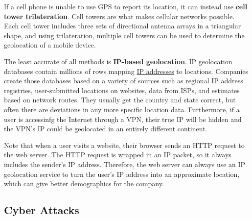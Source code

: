 \documentclass{article}
\begin{document}
  If a cell phone is unable to use GPS to report its location, it can instead use \textbf{cell tower trilateration}. Cell towers are what makes cellular networks possible. Each cell tower includes three sets of directional antenna arrays in a triangular shape, and using trilateration, multiple cell towers can be used to determine the geolocation of a mobile device. 

  The least accurate of all methods is \textbf{IP-based geolocation}. IP geolocation databases contain millions of rows mapping \hyperref[def:ip-addresses]{IP addresses} to locations. Companies create those databases based on a variety of sources such as regional IP address registries, user-submitted locations on websites, data from ISPs, and estimates based on network routes. They usually get the country and state correct, but often there are deviations in any more specific location data. Furthermore, if a user is accessinfg the Internet through a VPN, their true IP will be hidden and the VPN's IP could be geolocated in an entirely different continent. 

  Note that when a user visits a website, their browser sends an HTTP request to the web server. The HTTP request is wrapped in an IP packet, so it always includes the sender's IP address. Therefore, the web server can always use an IP geolocation service to turn the user's IP address into an approximate location, which can give better demographics for the company. 

  \subsection{Cyber Attacks}
\end{document}
